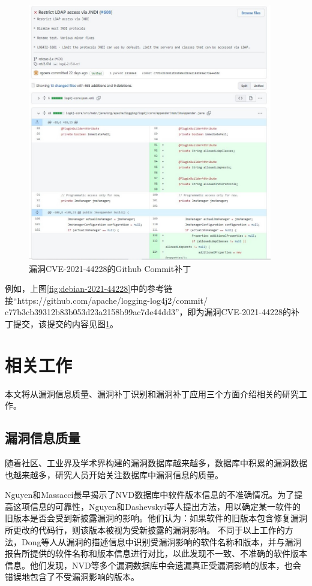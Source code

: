 \begin{figure}[!t]
    \centering
    \includegraphics[width=0.95\textwidth]{fig/commit-2021-44228}
    \caption{漏洞CVE-2021-44228的Github Commit补丁}
    \label{fig:commit-2021-44228}
\end{figure}

例如，上图\ref{fig:debian-2021-44228}中的参考链接“https://github.com/apache/logging-log4j2/commit/\\c77b3cb39312b83b053d23a2158b99ac7de44dd3”，即为漏洞CVE-2021-44228的补丁提交，该提交的内容见图\ref{fig:commit-2021-44228}。


\section{相关工作}
本文将从漏洞信息质量、漏洞补丁识别和漏洞补丁应用三个方面介绍相关的研究工作。

\subsection{漏洞信息质量}
随着社区、工业界及学术界构建的漏洞数据库越来越多，数据库中积累的漏洞数据也越来越多，研究人员开始关注数据库中漏洞信息的质量。

Nguyen和Massacci\cite{nguyen2013reliability}最早揭示了NVD数据库中软件版本信息的不准确情况。为了提高这项信息的可靠性，Nguyen\cite{nguyen2016automatic}和Dashevskyi等人\cite{dashevskyi2018screening}提出方法，用以确定某一软件的旧版本是否会受到新披露漏洞的影响。他们认为：如果软件的旧版本包含修复漏洞所更改的代码行，则该版本被视为受新披露的漏洞影响。
不同于以上工作的方法，Dong等人\cite{dong2019towards}从漏洞的描述信息中识别受漏洞影响的软件名称和版本，并与漏洞报告所提供的软件名称和版本信息进行对比，以此发现不一致、不准确的软件版本信息。他们发现，NVD等多个漏洞数据库中会遗漏真正受漏洞影响的版本，也会错误地包含了不受漏洞影响的版本。

